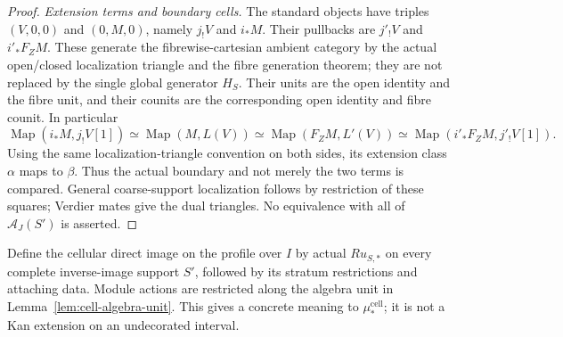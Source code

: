 \documentclass[11pt]{article}
\theoremstyle{definition}
\theoremstyle{remark}
\begin{document}
\begin{proof}
\emph{Extension terms and boundary cells.}
The standard objects have triples $(V,0,0)$ and $(0,M,0)$, namely
$j_!V$ and $i_*M$.  Their pullbacks are $j'_!V$ and $i'_*F_ZM$.
These generate the fibrewise-cartesian ambient category by the actual
open/closed localization triangle and the fibre generation theorem;
they are not replaced by the single global generator $H_S$.
Their units are the open identity and the fibre unit, and their
counits are the corresponding open identity and fibre counit.
In particular
\[
 \operatorname{Map}(i_*M,j_!V[1])
       \simeq\operatorname{Map}(M,L(V))
       \simeq\operatorname{Map}(F_ZM,L'(V))
       \simeq\operatorname{Map}(i'_*F_ZM,j'_!V[1]).
\]
Using the same localization-triangle convention on both sides, its
extension class $\alpha$ maps to $\beta$.  Thus the actual boundary
and not merely the two terms is compared.  General coarse-support
localization follows by restriction of these squares; Verdier mates
give the dual triangles.  No equivalence with all of
$\mathcal A_J(S')$ is asserted.
\end{proof}

Define the cellular direct image on the profile over $I$ by actual
$Ru_{S,*}$ on every complete inverse-image support $S'$, followed by
its stratum restrictions and attaching data.  Module actions are
restricted along the algebra unit in Lemma~\ref{lem:cell-algebra-unit}.
This gives a concrete meaning to $\mu_*^{\mathrm{cell}}$; it is not a
Kan extension on an undecorated interval.
\end{document}
